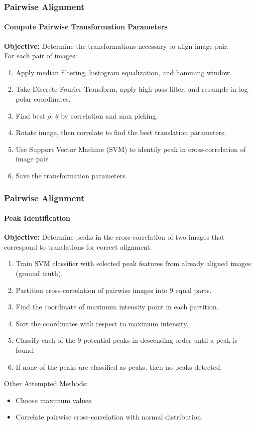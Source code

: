 \documentclass{beamer}
\begin{document}
\begin{frame}
\frametitle{Pairwise Alignment}
\framesubtitle{Compute Pairwise Transformation Parameters}
\textbf{Objective:} Determine the transformations necessary to align image pair. \\
For each pair of images:
\begin{enumerate}
\item Apply median filtering, histogram equalization, and hamming window. 
\item Take Discrete Fourier Transform, apply high-pass filter, and resample in log-polar coordinates. 
\item Find best $\rho$, $\theta$ by correlation and max picking. 
\item Rotate image, then correlate to find the best translation parameters.
\item Use Support Vector Machine (SVM) to identify peak in cross-correlation of image pair. 
\item Save the transformation parameters.
\end{enumerate}
\end{frame}

\begin{frame}
\frametitle{Pairwise Alignment}
\framesubtitle{Peak Identification}
\textbf{Objective:} Determine peaks in the cross-correlation of two images that correspond to translations for correct alignment. \\
\begin{enumerate}
\item Train SVM classifier with selected peak features from already aligned images (ground truth).
\item Partition cross-correlation of pairwise images into 9 equal parts.
\item Find the coordinate of maximum intensity point in each partition.
\item Sort the coordinates with respect to maximum intensity.
\item Classify each of the 9 potential peaks in descending order until a peak is found.
\item If none of the peaks are classified as peaks, then no peaks detected.
\end{enumerate}
Other Attempted Methods:
\begin{itemize}
\item Choose maximum values. 
\item Correlate pairwise cross-correlation with normal distribution. 
\end{itemize}
\end{frame}
\end{document}

